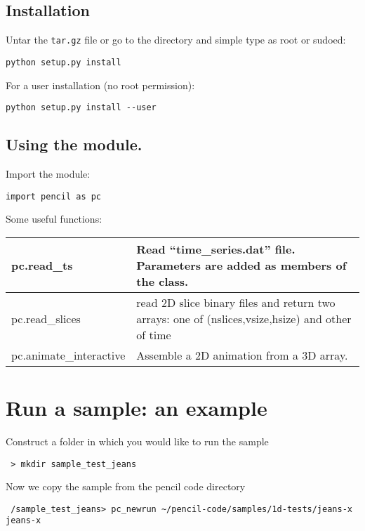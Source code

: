 \documentclass[a4paper,12pt]{article}
\begin{document}
\subsection{Installation}
Untar the \texttt{tar.gz} file or go to the directory and simple type as root or sudoed:
\begin{verbatim}
python setup.py install
\end{verbatim}
For a user installation (no root permission):
\begin{verbatim}
python setup.py install --user
\end{verbatim}

\subsection{Using the module.}
Import the module:
\begin{verbatim}
import pencil as pc
\end{verbatim}
Some useful functions:
\begin{center}
\begin{tabular}{|l|l|}\hline
pc.read\_ts & Read ``time\_series.dat'' file. Parameters are added as members of the class. \\\hline
pc.read\_slices & read 2D slice binary files and return two arrays: one of (nslices,vsize,hsize) and other of time\\\hline
pc.animate\_interactive &  Assemble a 2D animation from a 3D array. \\\hline
\end{tabular}
\end{center}

\section{Run a sample: an example}

Construct a folder in which you would like to run the sample
\begin{verbatim}
 > mkdir sample_test_jeans
\end{verbatim}

Now we copy the sample from the pencil code directory
\begin{verbatim}
 /sample_test_jeans> pc_newrun ~/pencil-code/samples/1d-tests/jeans-x jeans-x
\end{verbatim}
\end{document}
